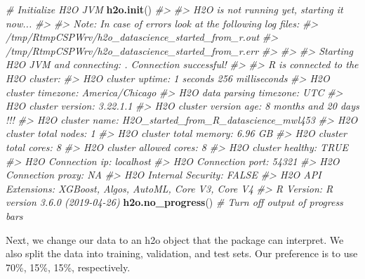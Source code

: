 \documentclass[]{book}
\newenvironment{Shaded}{\begin{snugshade}}{\end{snugshade}}
\newcommand{\CommentTok}[1]{\textcolor[rgb]{0.56,0.35,0.01}{\textit{#1}}}
\newcommand{\DataTypeTok}[1]{\textcolor[rgb]{0.13,0.29,0.53}{#1}}
\newcommand{\DecValTok}[1]{\textcolor[rgb]{0.00,0.00,0.81}{#1}}
\newcommand{\FloatTok}[1]{\textcolor[rgb]{0.00,0.00,0.81}{#1}}
\newcommand{\KeywordTok}[1]{\textcolor[rgb]{0.13,0.29,0.53}{\textbf{#1}}}
\newcommand{\NormalTok}[1]{#1}
\newcommand{\StringTok}[1]{\textcolor[rgb]{0.31,0.60,0.02}{#1}}
\begin{document}
\begin{Shaded}
\begin{Highlighting}[]
\CommentTok{# Initialize H2O JVM}
\KeywordTok{h2o.init}\NormalTok{()}
\CommentTok{#> }
\CommentTok{#> H2O is not running yet, starting it now...}
\CommentTok{#> }
\CommentTok{#> Note:  In case of errors look at the following log files:}
\CommentTok{#>     /tmp/RtmpCSPWrv/h2o_datascience_started_from_r.out}
\CommentTok{#>     /tmp/RtmpCSPWrv/h2o_datascience_started_from_r.err}
\CommentTok{#> }
\CommentTok{#> }
\CommentTok{#> Starting H2O JVM and connecting: . Connection successful!}
\CommentTok{#> }
\CommentTok{#> R is connected to the H2O cluster: }
\CommentTok{#>     H2O cluster uptime:         1 seconds 256 milliseconds }
\CommentTok{#>     H2O cluster timezone:       America/Chicago }
\CommentTok{#>     H2O data parsing timezone:  UTC }
\CommentTok{#>     H2O cluster version:        3.22.1.1 }
\CommentTok{#>     H2O cluster version age:    8 months and 20 days !!! }
\CommentTok{#>     H2O cluster name:           H2O_started_from_R_datascience_mwl453 }
\CommentTok{#>     H2O cluster total nodes:    1 }
\CommentTok{#>     H2O cluster total memory:   6.96 GB }
\CommentTok{#>     H2O cluster total cores:    8 }
\CommentTok{#>     H2O cluster allowed cores:  8 }
\CommentTok{#>     H2O cluster healthy:        TRUE }
\CommentTok{#>     H2O Connection ip:          localhost }
\CommentTok{#>     H2O Connection port:        54321 }
\CommentTok{#>     H2O Connection proxy:       NA }
\CommentTok{#>     H2O Internal Security:      FALSE }
\CommentTok{#>     H2O API Extensions:         XGBoost, Algos, AutoML, Core V3, Core V4 }
\CommentTok{#>     R Version:                  R version 3.6.0 (2019-04-26)}
\KeywordTok{h2o.no_progress}\NormalTok{() }\CommentTok{# Turn off output of progress bars}
\end{Highlighting}
\end{Shaded}

Next, we change our data to an h2o object that the package can interpret. We also split the data into training, validation, and test sets. Our preference is to use 70\%, 15\%, 15\%, respectively.

\begin{Shaded}
\end{Shaded}
\end{document}
